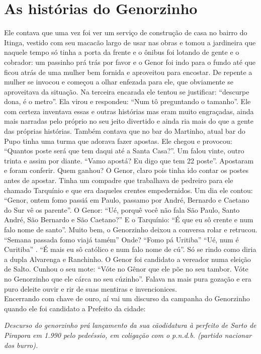 \documentclass[12pt,brazil,]{book}
\begin{document}
\section{As histórias do
Genorzinho}\label{as-histuxf3rias-do-genorzinho}

Ele contava que uma vez foi ver um serviço de construção de casa no
bairro do Itinga, vestido com seu macacão largo de usar nas obras e
tomou a jardineira que naquele tempo só tinha a porta da frente e o
ônibus foi lotando de gente e o cobrador: um passinho prá trás por favor
e o Genor foi indo para o fundo até que ficou atrás de uma mulher bem
fornida e aproveitou para encostar. De repente a mulher se invocou e
começou a olhar enfezada para ele, que obviamente se aproveitava da
situação. Na terceira encarada ele tentou se justificar: ``descurpe
dona, é o metro''. Ela virou e respondeu: ``Num tô preguntando o
tamanho''. Ele com certeza inventava essas e outras histórias mas eram
muito engraçadas, ainda mais narradas pelo próprio no seu jeito
divertido e ainda ria mais do que a gente das próprias histórias. Também
contava que no bar do Martinho, atual bar do Pupo tinha uma turma que
adorava fazer apostas. Ele chegou e provocou: ``Quantos poste será que
tem daqui até a Santa Casa?''. Um falou vinte, outro trinta e assim por
diante. ``Vamo apostá? Eu digo que tem 22 poste''. Apostaram e foram
conferir. Quem ganhou? O Genor, claro pois tinha ido contar os postes
antes de apostar. Tinha um compadre que trabalhava de pedreiro para ele
chamado Tarquínio e que era daqueles crentes empedernidos. Um dia ele
contou: ``Genor, ontem fomo passiá em Paulo, passamo por André, Bernardo
e Caetano do Sur vê os parente''. O Genor: ``Ué, porquê você não fala
São Paulo, Santo André, São Bernardo e São Caetano?'' E o Tarquínio: ``É
que eu sô crente e num falo nome de santo''. Muito bem, o Genorzinho
deixou a conversa rolar e retrucou. ``Semana passada fomo viajá tamém''
Onde? ``Fomo pá Uritiba'' ``Ué, num é Curitiba'' . ``É mais eu sô
católico e num falo nome de cú''. Só se rindo como diria a dupla
Alvarenga e Ranchinho. O Genor foi candidato a vereador numa eleição de
Salto. Cunhou o seu mote: ``Vóte no Gênor que ele põe no seu tambor.
Vóte no Genorzinho que ele cárca no seu cúzinho''. Falava na mais pura
gozação e era puro deleite ouvir e rir de suas mentiras e
invencionices.\\
Encerrando com chave de ouro, aí vai um discurso da campanha do
Genorzinho quando ele foi candidato a Prefeito da cidade:

\emph{Descurso do genorzinho prá lançamento da sua cãodidatura à
perfeito de Sarto de Pirapora em 1.990 pelo pedeéssio, em coligação com
o p.n.d.b. (partido nacionar dos burro).}
\end{document}
